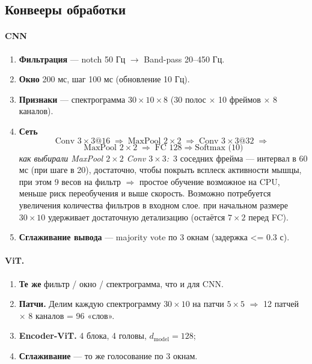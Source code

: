 \documentclass[12pt,a4paper]{article}
\begin{document}
\subsection{Конвееры обработки}
\paragraph{CNN}
\begin{enumerate}
  \item \textbf{Фильтрация} — notch 50 Гц $\to$ Band-pass 20–450 Гц.
  \item \textbf{Окно} 200 мс, шаг 100 мс  (обновление 10 Гц).
  \item \textbf{Признаки} — спектрограмма  
        $30{\times}10{\times}8$ (30 полос $\times$ 10 фреймов $\times$ 8 каналов).
  \item \textbf{Сеть}  
        \[
        \text{Conv }3{\times}3@16 \;\Rightarrow\; \boxed{\text{MaxPool }2{\times}2}\;
        \Rightarrow\; \text{Conv }3{\times}3@32 \;\Rightarrow\; \]
            \[
        \boxed{\text{MaxPool }2{\times}2}\;
        \Rightarrow\; \text{FC 128} \Rightarrow \text{Softmax (10)}
        \]
        \textit{как выбирали MaxPool $2{\times}2$ Conv $3{\times}3$:}\,  
        3 соседних фрейма — интервал в 60 мс (при шаге в 20), достаточно, чтобы покрыть всплеск активности мышцы, при этом 9 весов на фильтр $\Rightarrow$ простое обучение возможное на CPU,
        меньше риск переобучения и выше скорость. Возможно потребуется увеличения количества фильтров в входном слое.
        при начальном размере $30{\times}10$ удерживает
        достаточную детализацию (остаётся $7{\times}2$ перед FC).
  \item \textbf{Сглаживание вывода} — majority vote по 3 окнам (задержка <= 0.3 с).
\end{enumerate}


\vspace{0.8em}


\paragraph{ViT.}
\begin{enumerate}
  \item[1–3.] \textbf{Те же} фильтр / окно / спектрограмма, что и для CNN.
  \item[4.] \textbf{Патчи.}  Делим каждую спектрограмму $30{\times}10$  
        на патчи $5{\times}5$  $\Rightarrow$  12 патчей $\times$ 8 каналов = 96 «слов».
  \item[5.] \textbf{Encoder-ViT.} 4 блока, 4 головы, $d_{\text{model}}{=}128$;  
  \item[6.] \textbf{Сглаживание} — то же голосование по 3 окнам.
\end{enumerate}
\end{document}
